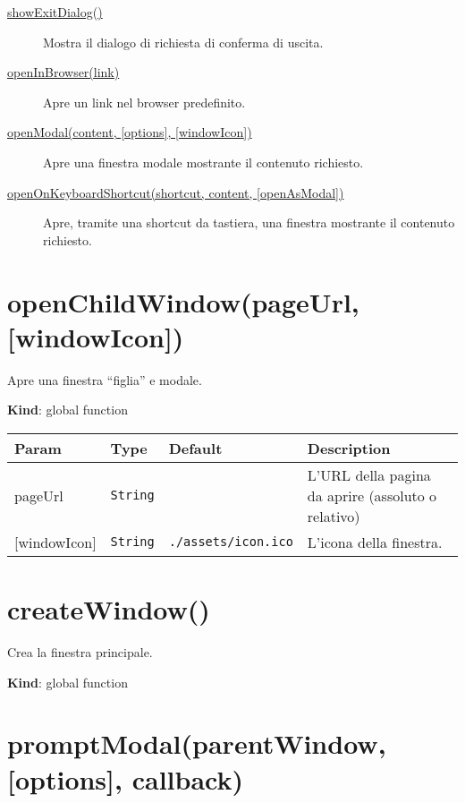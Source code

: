 \begin{description}
\item[{ \protect\hyperlink{showExitDialog}{showExitDialog()} }]
Mostra il dialogo di richiesta di conferma di uscita.
\item[{ \protect\hyperlink{openInBrowser}{openInBrowser(link)} }]
Apre un link nel browser predefinito.
\item[{ \protect\hyperlink{openModal}{openModal(content, {[}options{]},
{[}windowIcon{]})} }]
Apre una finestra modale mostrante il contenuto richiesto.
\item[{
\protect\hyperlink{openOnKeyboardShortcut}{openOnKeyboardShortcut(shortcut,
content, {[}openAsModal{]})} }]
Apre, tramite una shortcut da tastiera, una finestra mostrante il
contenuto richiesto.
\end{description}

\protect\hypertarget{openChildWindow}{}{}

\hypertarget{openchildwindowpageurl-windowicon}{%
\section{openChildWindow(pageUrl,
{[}windowIcon{]})}\label{openchildwindowpageurl-windowicon}}

Apre una finestra ``figlia'' e modale.

\textbf{Kind}: global function

\begin{longtabu} to \textwidth {X[1,L,m]X[1,L,m]X[1.5,L,m]X[1.5,L,m]}
\toprule
Param & Type & Default & Description\tabularnewline
\midrule
\endhead
pageUrl & \texttt{String} & & L'URL della pagina da aprire (assoluto o
relativo)\tabularnewline
{[}windowIcon{]} & \texttt{String} & \texttt{./assets/icon.ico} &
L'icona della finestra.\tabularnewline
\bottomrule
\end{longtabu}

\protect\hypertarget{createWindow}{}{}

\hypertarget{createwindow}{%
\section{createWindow()}\label{createwindow}}

Crea la finestra principale.

\textbf{Kind}: global function\\
\protect\hypertarget{promptModal}{}{}

\hypertarget{promptmodalparentwindow-options-callback}{%
\section{promptModal(parentWindow, {[}options{]},
callback)}\label{promptmodalparentwindow-options-callback}}

